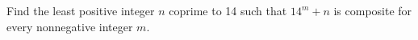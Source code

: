 Find the least positive integer $n$ coprime to 14 such that $14^m+n$ is composite for every nonnegative integer $m$.
